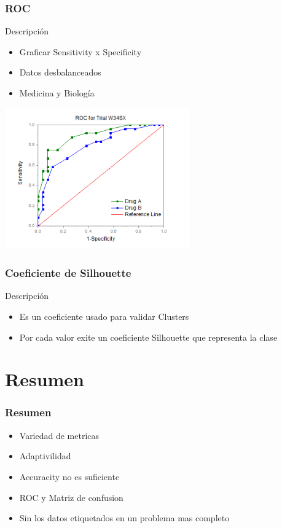 \documentclass{beamer}
\begin{document}
\begin{frame}
  \frametitle{ROC}

  \begin{block}{Descripci\'on}
  	\begin{itemize}
  	\item Graficar Sensitivity x Specificity
  	\item Datos desbalanceados
  	\item Medicina y Biolog\'ia
  	\end{itemize}
  \end{block}

  \includegraphics[scale=0.7]{roc.png} 
\end{frame}

\begin{frame}
  \frametitle{Coeficiente de Silhouette}
  \begin{block}{Descripci\'on}
  \begin{itemize}
  \item Es un coeficiente usado para validar Clusters
  	\item Por cada valor exite un coeficiente Silhouette que representa la clase 
  \end{itemize}
  	
  \end{block}
\end{frame}


\section{Resumen}
\begin{frame}
\frametitle{Resumen}
\begin{block}{}
	\begin{itemize}
	 \item Variedad de metricas
	 \item Adaptivilidad
	 \item Accuracity no es suficiente
	 \item ROC y Matriz de confusion 
	 \item Sin los datos etiquetados en un problema mas completo
	\end{itemize}  
\end{block}

\end{frame}
\end{document}
